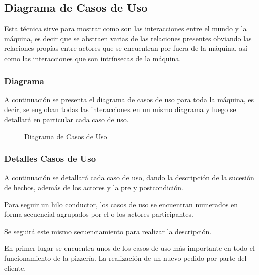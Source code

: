 \documentclass[a4paper,10pt]{article}
\begin{document}
\subsection*{Diagrama de Casos de Uso}

Esta t\'ecnica sirve para mostrar como son las interacciones entre el mundo y la m\'aquina, es decir que se abstraen varias de las relaciones presentes
obviando las relaciones prop\'ias entre actores que se encuentran por fuera de la m\'aquina, as\'i como las interacciones que son intr\'insecas de la m\'aquina.

\subsubsection*{Diagrama}

A continuaci\'on se presenta el diagrama de casos de uso para toda la m\'aquina, es decir, se engloban todas las interacciones en un mismo diagrama
y luego se detallar\'a en particular cada caso de uso.


\begin{figure}[H]
\centering
{}
\caption{Diagrama de Casos de Uso}
\end{figure}


\subsubsection*{Detalles Casos de Uso}

A continuaci\'on se detallar\'a cada caso de uso, dando la descripci\'on de la sucesi\'on de hechos, adem\'as de los actores y la pre y postcondici\'on.

Para seguir un hilo conductor, los casos de uso se encuentran numerados en forma secuencial agrupados por el o los actores participantes.

Se seguir\'a este mismo secuenciamiento para realizar la descripci\'on.

\bigskip


En primer lugar se encuentra unos de los casos de uso m\'as importante en todo el funcionamiento de la pizzer\'ia. La realizaci\'on de un nuevo
pedido por parte del cliente.
\end{document}
